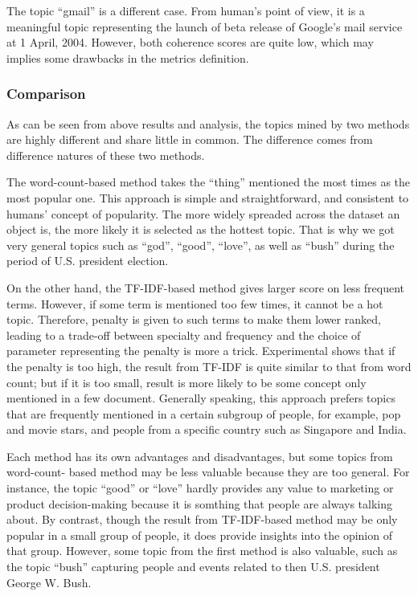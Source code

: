 \documentclass[conference]{IEEEtran}
\begin{document}
The topic ``gmail'' is a different case. From human's point of view, it
is a meaningful topic representing the launch of beta release of
Google's mail service at 1 April, 2004. However, both coherence scores
are quite low, which may implies some drawbacks in the metrics
definition.

\hypertarget{comparison}{%
\subsubsection{Comparison}\label{comparison}}

As can be seen from above results and analysis, the topics mined by two
methods are highly different and share little in common. The difference
comes from difference natures of these two methods.

The word-count-based method takes the ``thing'' mentioned the most times
as the most popular one. This approach is simple and straightforward,
and consistent to humans' concept of popularity. The more widely
spreaded across the dataset an object is, the more likely it is selected
as the hottest topic. That is why we got very general topics such as
``god'', ``good'', ``love'', as well as ``bush'' during the period of
U.S. president election.

On the other hand, the TF-IDF-based method gives larger score on less
frequent terms. However, if some term is mentioned too few times, it
cannot be a hot topic. Therefore, penalty is given to such terms to make
them lower ranked, leading to a trade-off between specialty and
frequency and the choice of parameter representing the penalty is more a
trick. Experimental shows that if the penalty is too high, the result
from TF-IDF is quite similar to that from word count; but if it is too
small, result is more likely to be some concept only mentioned in a few
document. Generally speaking, this approach prefers topics that are
frequently mentioned in a certain subgroup of people, for example, pop
and movie stars, and people from a specific country such as Singapore
and India.

Each method has its own advantages and disadvantages, but some topics
from word-count- based method may be less valuable because they are too
general. For instance, the topic ``good'' or ``love'' hardly provides
any value to marketing or product decision-making because it is somthing
that people are always talking about. By contrast, though the result
from TF-IDF-based method may be only popular in a small group of people,
it does provide insights into the opinion of that group. However, some
topic from the first method is also valuable, such as the topic ``bush''
capturing people and events related to then U.S. president George W.
Bush.
\end{document}
